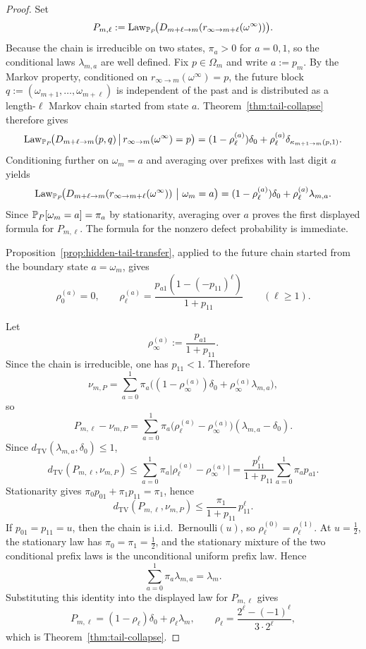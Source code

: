 \begin{proof}
Set
\[
P_{m,\ell}
:=
\operatorname{Law}_{\mathbb{P}_P}\!\bigl(D_{m+\ell\to m}(r_{\infty\to m+\ell}(\omega^\infty))\bigr).
\]
Because the chain is irreducible on two states, $\pi_a>0$ for $a=0,1$, so the
conditional laws $\lambda_{m,a}$ are well defined.
Fix $p\in\Omega_m$ and write $a:=p_m$.  By the Markov property, conditioned on
$r_{\infty\to m}(\omega^\infty)=p$, the future block
$q:=(\omega_{m+1},\dots,\omega_{m+\ell})$ is independent of the past and is
distributed as a length-$\ell$ Markov chain started from state $a$.
Theorem~\ref{thm:tail-collapse} therefore gives
\[
\operatorname{Law}_{\mathbb{P}_P}\!\bigl(D_{m+\ell\to m}(p,q)\,\big|\,r_{\infty\to m}(\omega^\infty)=p\bigr)
=
(1-\rho_\ell^{(a)})\delta_0+\rho_\ell^{(a)}\delta_{\kappa_{m+1\to m}(p,1)}.
\]
Conditioning further on $\omega_m=a$ and averaging over prefixes with last
digit $a$ yields
\[
\operatorname{Law}_{\mathbb{P}_P}\!\bigl(
D_{m+\ell\to m}(r_{\infty\to m+\ell}(\omega^\infty))
\ \big|\ \omega_m=a
\bigr)
=
(1-\rho_\ell^{(a)})\delta_0+\rho_\ell^{(a)}\lambda_{m,a}.
\]
Since $\mathbb{P}_P[\omega_m=a]=\pi_a$ by stationarity, averaging over $a$ proves the
first displayed formula for $P_{m,\ell}$.  The formula for the nonzero defect
probability is immediate.

Proposition~\ref{prop:hidden-tail-transfer}, applied to the future chain
started from the boundary state $a=\omega_m$, gives
\[
\rho_0^{(a)}=0,
\qquad
\rho_\ell^{(a)}
=
\frac{p_{a1}(1-(-p_{11})^\ell)}{1+p_{11}}
\qquad(\ell\ge 1).
\]

Let
\[
\rho_\infty^{(a)}:=\frac{p_{a1}}{1+p_{11}}.
\]
Since the chain is irreducible, one has $p_{11}<1$.  Therefore
\[
\nu_{m,P}
=
\sum_{a=0}^1
\pi_a\bigl((1-\rho_\infty^{(a)})\delta_0+\rho_\infty^{(a)}\lambda_{m,a}\bigr),
\]
so
\[
P_{m,\ell}-\nu_{m,P}
=
\sum_{a=0}^1
\pi_a\bigl(\rho_\ell^{(a)}-\rho_\infty^{(a)}\bigr)(\lambda_{m,a}-\delta_0).
\]
Since $d_{\mathrm{TV}}(\lambda_{m,a},\delta_0)\le 1$,
\[
d_{\mathrm{TV}}(P_{m,\ell},\nu_{m,P})
\le
\sum_{a=0}^1 \pi_a\bigl|\rho_\ell^{(a)}-\rho_\infty^{(a)}\bigr|
=
\frac{p_{11}^{\ell}}{1+p_{11}}
\sum_{a=0}^1 \pi_a p_{a1}.
\]
Stationarity gives $\pi_0p_{01}+\pi_1p_{11}=\pi_1$, hence
\[
d_{\mathrm{TV}}(P_{m,\ell},\nu_{m,P})
\le
\frac{\pi_1}{1+p_{11}}\,p_{11}^{\ell}.
\]
If $p_{01}=p_{11}=u$, then the chain is i.i.d.\ Bernoulli$(u)$, so
$\rho_\ell^{(0)}=\rho_\ell^{(1)}$.  At $u=\frac12$, the stationary law has
$\pi_0=\pi_1=\frac12$, and the stationary mixture of the two conditional
prefix laws is the unconditional uniform prefix law.  Hence
\[
\sum_{a=0}^1 \pi_a\lambda_{m,a}=\lambda_m.
\]
Substituting this identity into the displayed law for $P_{m,\ell}$ gives
\[
P_{m,\ell}
=(1-\rho_\ell)\delta_0+\rho_\ell\lambda_m,
\qquad
\rho_\ell=\frac{2^\ell-(-1)^\ell}{3\cdot 2^\ell},
\]
which is Theorem~\ref{thm:tail-collapse}.
\end{proof}

